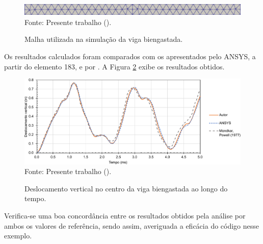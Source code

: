 \begin{figure}[h!]
    \centering
    \caption{Malha utilizada na simulação da viga biengastada.}
    \includegraphics[width=\linewidth]{Figuras/vigas/mesh2.png}
    \\Fonte: Presente trabalho (\the\year).
    \label{fig:viga2-mesh}
\end{figure}

Os resultados calculados foram comparados com os apresentados pelo ANSYS, a partir do elemento 183, e por \cite{mondkar1977ansa}. A Figura \ref{fig:res-viga2} exibe os resultados obtidos.

\begin{figure}[h!]
    \centering
    \caption{Deslocamento vertical no centro da viga biengastada ao longo do tempo.}
    \includegraphics[width=\linewidth]{Figuras/vigas/res2.pdf}
    \\Fonte: Presente trabalho (\the\year).
    \label{fig:res-viga2}
\end{figure}

Verifica-se uma boa concordância entre os resultados obtidos pela análise por ambos os valores de referência, sendo assim, averiguada a eficácia do código nesse exemplo.